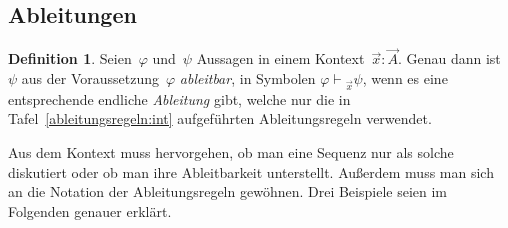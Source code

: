 \documentclass[a4paper,ngerman,12pt]{scrartcl}
\theoremstyle{definition}
\newtheorem{defn}{Definition}[section]
\theoremstyle{plain}
\theoremstyle{remark}
\newcommand{\seq}[1]{\mathrel{\vdash\!\!\!_{#1}}}
\renewcommand{\_}{\mathpunct{.}\,}
\newcommand{\?}{\,{:}\,}
\begin{document}
\subsection{Ableitungen}

\begin{defn}\label{defn-ableitungen}Seien~$\varphi$ und~$\psi$ Aussagen in einem Kontext~$\vec x : \vec
A$. Genau dann ist~$\psi$ aus der Voraussetzung~$\varphi$ \emph{ableitbar}, in
Symbolen
$\varphi \seq{\vec x} \psi$,
wenn es eine entsprechende endliche \emph{Ableitung} gibt, welche nur die
in Tafel~\ref{ableitungsregeln:int} aufgeführten Ableitungsregeln verwendet.
\end{defn}

Aus dem Kontext muss hervorgehen, ob man eine Sequenz nur als solche
diskutiert oder ob man ihre Ableitbarkeit unterstellt. Außerdem muss
man sich an die Notation der Ableitungsregeln gewöhnen. Drei Beispiele seien im
Folgenden genauer erklärt.
\end{document}
